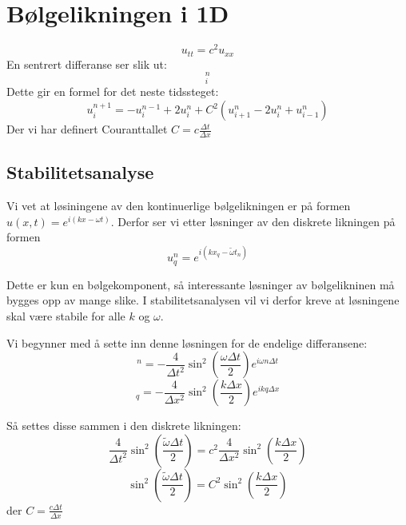\documentclass[a4paper, 10pt]{article}
\begin{document}
\section{Bølgelikningen i 1D}
\begin{equation}
	u_{tt} = c^2 u_{xx} 
\end{equation}
En sentrert differanse ser slik ut:
\begin{equation}
	[D_t D_t u = c^2 D_x D_x u]_i^n
\end{equation}
Dette gir en formel for det neste tidssteget:
\begin{equation}
	u^{n+1}_i = -u^{n-1}_i + 2u^n_i + C^2
\left(u^{n}_{i+1}-2u^{n}_{i} + u^{n}_{i-1}\right)
\end{equation}
Der vi har definert Couranttallet $C = c\frac{\Delta t}{\Delta x}$

\subsection{Stabilitetsanalyse}
Vi vet at løsiningene av den kontinuerlige bølgelikningen er på formen $u(x, t) = e^{i(kx - \omega t)}$. Derfor ser vi etter løsninger av den diskrete likningen på formen 
\begin{equation}
	u_q^n = e^{i(kx_q - \tilde{\omega }t_n)}
\end{equation}

Dette er kun en bølgekomponent, så interessante løsninger av bølgelikninen må bygges opp av mange slike. I stabilitetsanalysen vil vi derfor kreve at løsningene skal være stabile for alle $k$ og $\omega$.

Vi begynner med å sette inn denne løsningen for de endelige differansene:
\begin{equation}
	[D_tD_t e^{i\omega t}]^n = -\frac{4}{\Delta t^2}\sin^2\left(
\frac{\omega\Delta t}{2}\right)e^{i\omega n\Delta t}
\end{equation}
\begin{equation}
	[D_xD_x e^{ikx}]_q = -\frac{4}{\Delta x^2}\sin^2\left(
\frac{k\Delta x}{2}\right)e^{ikq\Delta x} 
\end{equation}

Så settes disse sammen i den diskrete likningen:
\begin{equation}
	\frac{4}{\Delta t^2}\sin^2\left(\frac{\tilde\omega\Delta t}{2}\right)
= c^2 \frac{4}{\Delta x^2}\sin^2\left(\frac{k\Delta x}{2}\right)
\end{equation}
\begin{equation}
	\sin^2\left(\frac{\tilde\omega\Delta t}{2}\right)
= C^2\sin^2\left(\frac{k\Delta x}{2}\right)
\end{equation}
der $C = \frac{c\Delta t}{\Delta x}$
\end{document}
